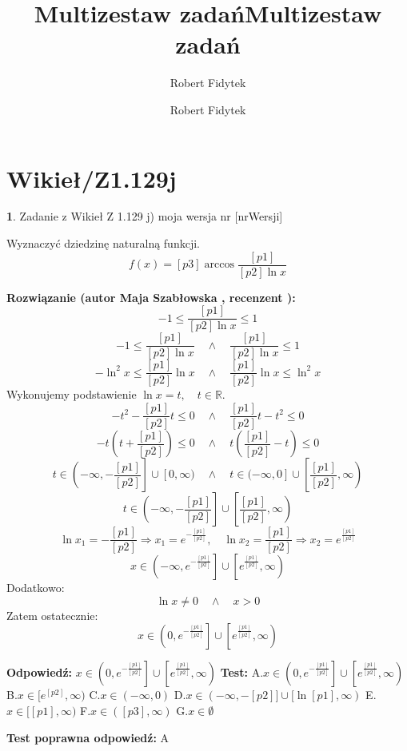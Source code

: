 \documentclass[12pt, a4paper]{article}
\title{Multizestaw zadań}
\author{Robert Fidytek}
\date{}\documentclass[12pt, a4paper]{article}
\title{Multizestaw zadań}
\author{Robert Fidytek}
\date{}
\theoremstyle{definition} %
\newtheorem{zad}{}
\theoremstyle{definition} %
\newtheorem{zad}{}
\newcommand{\kategoria}[1]{\section{#1}} %
\newcommand{\zadStart}[1]{\begin{zad}#1\newline} %
\newcommand{\zadStop}{\end{zad}}   %
\newcommand{\rozwStart}[2]{\noindent \textbf{Rozwiązanie (autor #1 , recenzent #2): }\newline} %
\newcommand{\rozwStop}{\newline}                                            %
\newcommand{\odpStart}{\noindent \textbf{Odpowiedź:}\newline}    %
\newcommand{\odpStop}{\newline}                                             %
\newcommand{\testStart}{\noindent \textbf{Test:}\newline} %
\newcommand{\testStop}{\newline} %
\newcommand{\kluczStart}{\noindent \textbf{Test poprawna odpowiedź:}\newline} %
\newcommand{\kluczStop}{\newline} %
\begin{document}
\maketitle


\kategoria{Wikieł/Z1.129j}
\zadStart{Zadanie z Wikieł Z 1.129 j) moja wersja nr [nrWersji]}

Wyznaczyć dziedzinę naturalną funkcji.
$$f(x)=[p3]\arccos \frac{[p1]}{[p2]\ln x}$$

\zadStop

\rozwStart{Maja Szabłowska}{}
$$-1\leq \frac{[p1]}{[p2]\ln x} \leq 1 $$
$$-1\leq \frac{[p1]}{[p2]\ln x} \quad \land \quad \frac{[p1]}{[p2]\ln x} \leq 1$$
$$-\ln^{2}x\leq \frac{[p1]}{[p2]}\ln x \quad \land \quad \frac{[p1]}{[p2]}\ln x \leq \ln^{2}x$$
Wykonujemy podstawienie $\ln x=t, \quad t\in\mathbb{R}.$
$$-t^{2}-\frac{[p1]}{[p2]}t\leq 0 \quad \land \quad \frac{[p1]}{[p2]}t-t^{2}\leq 0$$
$$-t\left(t+\frac{[p1]}{[p2]}\right)\leq 0 \quad \land \quad t\left(\frac{[p1]}{[p2]}-t \right)\leq 0$$
$$t\in\left(-\infty, -\frac{[p1]}{[p2]}\right]\cup[0,\infty) \quad \land \quad t\in(-\infty,0]\cup\left[\frac{[p1]}{[p2]},\infty\right)$$
$$t\in\left(-\infty,-\frac{[p1]}{[p2]}\right]\cup\left[\frac{[p1]}{[p2]},\infty\right)$$
$$\ln x_{1}=-\frac{[p1]}{[p2]} \Rightarrow x_{1}=e^{-\frac{[p1]}{[p2]}}, \quad \ln x_{2}=\frac{[p1]}{[p2]} \Rightarrow x_{2}=e^{\frac{[p1]}{[p2]}}$$
$$x\in\left(-\infty,e^{-\frac{[p1]}{[p2]}}\right]\cup\left[e^{\frac{[p1]}{[p2]}},\infty\right)$$
Dodatkowo:
$$\ln x \neq 0 \quad \land \quad x>0$$
Zatem ostatecznie:
$$x\in\left(0,e^{-\frac{[p1]}{[p2]}}\right]\cup\left[e^{\frac{[p1]}{[p2]}},\infty\right)$$

\rozwStop
\odpStart
$x\in\left(0,e^{-\frac{[p1]}{[p2]}}\right]\cup\left[e^{\frac{[p1]}{[p2]}},\infty\right)$
\odpStop
\testStart
A.$x\in\left(0,e^{-\frac{[p1]}{[p2]}}\right]\cup\left[e^{\frac{[p1]}{[p2]}},\infty\right)$
B.$x\in[e^{[p2]},\infty)$
C.$x\in(-\infty, 0)$
D.$x\in(-\infty, -[p2]] \cup [\ln[p1],\infty)$
E.$x\in[[p1],\infty)$
F.$x\in([p3],\infty)$
G.$x\in\emptyset$

\testStop
\kluczStart
A
\kluczStop
\end{document}
